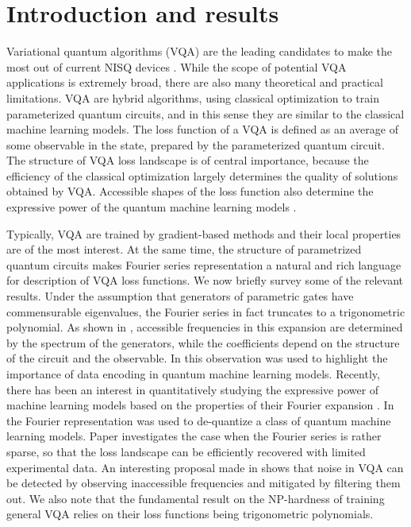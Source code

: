 \documentclass[twocolumn, amsfonts, amssymb, aps, nofootinbib]{revtex4-2}
\begin{document}
\section{Introduction and results}
Variational quantum algorithms (VQA) \cite{Cerezo2021} are the leading candidates to make the most out of current NISQ devices \cite{Preskill2018, Bharti2021}. While the scope of potential VQA applications is extremely broad, there are also many theoretical and practical limitations. VQA are hybrid algorithms, using classical optimization to train parameterized quantum circuits, and in this sense they are similar to the classical machine learning models. The loss function of a VQA is defined as an average of some observable in the state, prepared by the parameterized quantum circuit. The structure of VQA loss landscape is of central importance, because the efficiency of the classical optimization largely determines the quality of solutions obtained by VQA. Accessible shapes of the loss function also determine the expressive power of the quantum machine learning models \cite{Biamonte2017}.

Typically, VQA are trained by gradient-based methods and their local properties are of the most interest. At the same time, the structure of parametrized quantum circuits makes Fourier series representation a natural and rich language for description of VQA loss functions. We now briefly survey some of the relevant results. Under the assumption that generators of parametric gates have commensurable eigenvalues, the Fourier series in fact truncates to a trigonometric polynomial. As shown in \cite{Schuld2020}, accessible frequencies in this expansion are determined by the spectrum of the generators, while the coefficients depend on the structure of the circuit and the observable. In \cite{Schuld2020, GilVidal2020} this observation was used to highlight the importance of data encoding in quantum machine learning models. Recently, there has been an interest in quantitatively studying the expressive power of machine learning models based on the properties of their Fourier expansion \cite{Atchade-Adelomou2023, Casas2023}.
In \cite{Schreiber2022, Landman2023} the Fourier representation was used to de-quantize a class of quantum machine learning models. Paper \cite{Fontana2022} investigates the case when the Fourier series is rather sparse, so that the loss landscape can be efficiently recovered with limited experimental data. An interesting proposal made in \cite{Fontana2022a} shows that noise in VQA can be detected by observing inaccessible frequencies and mitigated by filtering them out. We also note that the fundamental result on the NP-hardness of training general VQA \cite{Bittel2021} relies on their loss functions being trigonometric polynomials.
\end{document}
